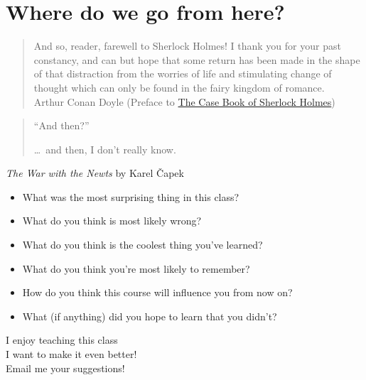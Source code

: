 \documentclass[a4paper,landscape,headrule,footrule,xetex]{foils}
\begin{document}
\maketitle

%
\section{Where do we go from here?}
\begin{quotation}
And so, reader, farewell to Sherlock Holmes! I thank you for your past constancy, and can but hope that some return has been made in the shape of that distraction from the worries of life and stimulating change of thought which can only be found in the fairy kingdom of romance.
\\ \mbox{} \hfill Arthur Conan Doyle (Preface to \href{http://compling.hss.ntu.edu.sg/canon/case.html}{The Case Book of Sherlock Holmes})
\end{quotation}



\begin{quotation}
  “And then?”
  \bigskip
  \bigskip
  
  \ldots\   and then, I don't really know.
\end{quotation}

\textit{The War with the Newts} by Karel Čapek

\begin{itemize}
\item What was the most surprising thing in this class?
\item What do you think is most likely wrong?
\item What do you think is the coolest thing you've learned?
\item What do you think you're most likely to
remember?
\item How do you think this course will influence you from now on?
\item What (if anything) did you hope to learn that you didn't?
\end{itemize}
\bigskip\bigskip
\begin{center}
  I enjoy teaching this class \\
  I  want to make it even better! \\
  Email me your suggestions!
\end{center}
\end{document}
